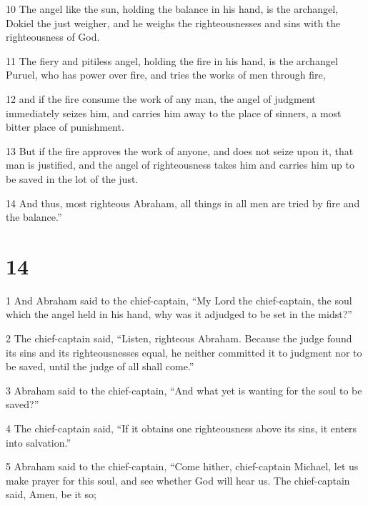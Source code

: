 \par 10 The angel like the sun, holding the balance in his hand, is the archangel, Dokiel the just weigher, and he weighs the righteousnesses and sins with the righteousness of God. 

\par 11 The fiery and pitiless angel, holding the fire in his hand, is the archangel Puruel, who has power over fire, and tries the works of men through fire, 

\par 12 and if the fire consume the work of any man, the angel of judgment immediately seizes him, and carries him away to the place of sinners, a most bitter place of punishment. 

\par 13 But if the fire approves the work of anyone, and does not seize upon it, that man is justified, and the angel of righteousness takes him and carries him up to be saved in the lot of the just. 

\par 14 And thus, most righteous Abraham, all things in all men are tried by fire and the balance.”

\chapter{14}

\par 1 And Abraham said to the chief-captain, “My Lord the chief-captain, the soul which the angel held in his hand, why was it adjudged to be set in the midst?” 

\par 2 The chief-captain said, “Listen, righteous Abraham. Because the judge found its sins and its righteousnesses equal, he neither committed it to judgment nor to be saved, until the judge of all shall come.” 

\par 3 Abraham said to the chief-captain, “And what yet is wanting for the soul to be saved?” 

\par 4 The chief-captain said, “If it obtains one righteousness above its sins, it enters into salvation.” 

\par 5 Abraham said to the chief-captain, “Come hither, chief-captain Michael, let us make prayer for this soul, and see whether God will hear us. The chief-captain said, Amen, be it so; 

